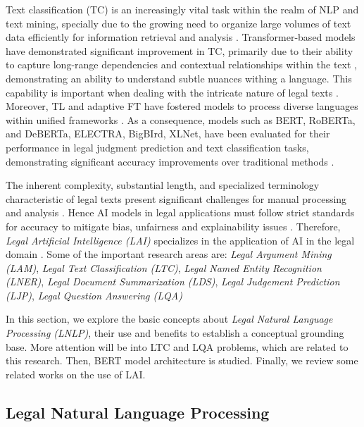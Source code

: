 \documentclass[onecolumn, journal, english, 12pt, a4paper]{IEEEtran} %
\theoremstyle{definition}
\begin{document}
Text classification (TC) is an increasingly vital task within the
realm of NLP and text mining, specially due to the growing need to
organize large volumes of text data efficiently for information
retrieval and analysis \cite{Allam2025}.  Transformer-based models
have demonstrated significant improvement in TC, primarily due to
their ability to capture long-range dependencies and contextual
relationships within the text
\cite{Allam2025}\cite{vaswani2017attention}, demonstrating an ability
to understand subtle nuances withing a language. This capability is
important when dealing with the intricate nature of legal texts
\cite{Ariai2024}. Moreover, TL and adaptive FT have fostered models to
process diverse languages within unified frameworks
\cite{Allam2025}. As a consequence, models such as BERT, RoBERTa, and
DeBERTa, ELECTRA, BigBIrd, XLNet, have been evaluated for their
performance in legal judgment prediction and text classification
tasks, demonstrating significant accuracy improvements over
traditional methods \cite{10725043}.

The inherent complexity, substantial length, and specialized
terminology characteristic of legal texts present significant
challenges for manual processing and analysis
\cite{Ariai2024}.  Hence AI models in legal applications must follow
strict standards for accuracy to mitigate bias, unfairness and
explainability issues \cite{Ariai2024}. Therefore, \textit{Legal
  Artificial Intelligence (LAI)} specializes in the application of AI
in the legal domain \cite{Zhong2020}. Some of the important research
areas are: \textit{Legal Argument Mining (LAM)}, \textit{Legal Text
  Classification (LTC)}, \textit{Legal Named Entity Recognition
  (LNER)}, \textit{Legal Document Summarization (LDS)}, \textit{Legal
  Judgement Prediction (LJP)}, \textit{Legal Question Answering (LQA)}

In this section, we explore the basic concepts about \textit{Legal
  Natural Language Processing (LNLP)}, their use
and benefits to establish a conceptual grounding base. More attention
will be into LTC and LQA problems, which are related to this
research. Then, BERT model architecture is studied. Finally, we review
some related works on the use of LAI. 

\subsection{Legal Natural Language Processing}
\label{sec:legal-lang-proc}
\end{document}
